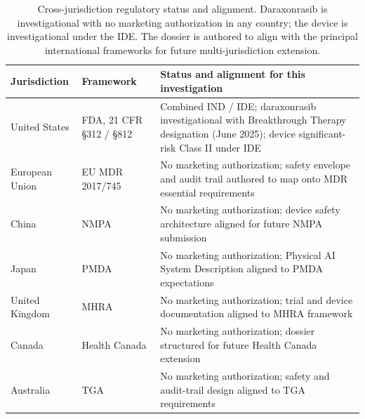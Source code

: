 \begin{table}[t]
\caption{Cross-jurisdiction regulatory status and alignment. Daraxonrasib is
investigational with no marketing authorization in any country; the device is
investigational under the IDE. The dossier is authored to align with the principal
international frameworks for future multi-jurisdiction extension.}
\label{tab:sec02-jurisdiction}
\centering
\begin{tabularx}{\textwidth}{L{2.6cm} L{3.4cm} Y}
\toprule
\textbf{Jurisdiction} & \textbf{Framework} & \textbf{Status and alignment for this investigation} \\
\midrule
United States & FDA, 21 CFR \S 312 / \S 812 & Combined IND / IDE; daraxonrasib investigational with Breakthrough Therapy designation (June 2025); device significant-risk Class II under IDE \\
European Union & EU MDR 2017/745 & No marketing authorization; safety envelope and audit trail authored to map onto MDR essential requirements \\
China & NMPA & No marketing authorization; device safety architecture aligned for future NMPA submission \\
Japan & PMDA & No marketing authorization; Physical AI System Description aligned to PMDA expectations \\
United Kingdom & MHRA & No marketing authorization; trial and device documentation aligned to MHRA framework \\
Canada & Health Canada & No marketing authorization; dossier structured for future Health Canada extension \\
Australia & TGA & No marketing authorization; safety and audit-trail design aligned to TGA requirements \\
\bottomrule
\end{tabularx}
\end{table}


